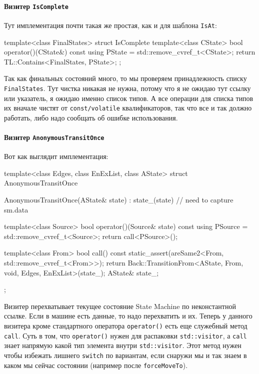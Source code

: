 \documentclass{article}
\begin{document}
{\paragraph{Визитер \texttt{IsComplete}}

Тут имплементация почти такая же простая, как и для шаблона \verb"IsAt":
\begin{cppcode}
template<class FinalStates>
struct IsComplete {
  template<class CState>
  bool operator()(CState&) const {
    using PState = std::remove_cvref_t<CState>;
    return TL::Contains<FinalStates, PState>;
  }
};
\end{cppcode}
Так как финальных состояний много, то мы проверяем принадлежность списку \verb"FinalStates".
Тут чистка никакая не нужна, потому что я не ожидаю тут ссылку или указатель, я ожидаю именно список типов.
А все операции для списка типов их вначале чистят от \verb"const/volatile" квалификаторов, так что все и так должно работать, либо надо сообщать об ошибке использования.

\paragraph{Визитер \texttt{AnonymousTransitOnce}}

Вот как выглядит имплементация:
\begin{cppcode}
template<class Edges, class EnExList, class AState>
struct AnonymousTransitOnce {
  AnonymousTransitOnce(AState& state) : state_(state) {
    // need to capture sm.data
  }

  template<class Source>
  bool operator()(Source& state) const {
    using PSource = std::remove_cvref_t<Source>;
    return call<PSource>();
  }

  template<class From>
  bool call() const {
    static_assert(areSame2<From, std::remove_cvref_t<From>>);
    return Back::TransitionFrom<AState, From, void, Edges, EnExList>(state_);
  }
  AState& state_;
};
\end{cppcode}
Визитер перехватывает текущее состояние State Machine по неконстантной ссылке.
Если в машине есть данные, то надо перехватить и их.
Теперь у данного визитера кроме стандартного оператора \verb"operator()" есть еще служебный метод \verb"call".
Суть в том, что \verb"operator()" нужен для распаковки \verb"std::visitor", а \verb"call" знает напрямую какой тип элемента внутри \verb"std::visitor".
Этот метод нужен чтобы избежать лишнего \verb"switch" по вариантам, если снаружи мы и так знаем в каком мы сейчас состоянии (например после \verb"forceMoveTo").

}
\end{document}
